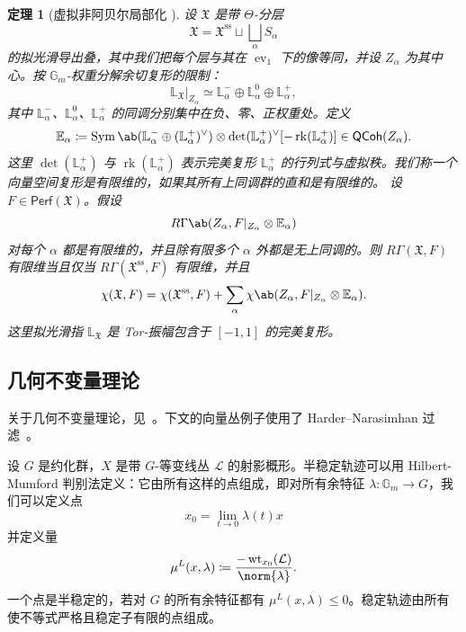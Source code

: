 \documentclass{amsart}
\newtheorem{thm}{定理}[section]
\theoremstyle{definition}
\theoremstyle{remark}
\theoremstyle{plain}
\theoremstyle{definition}
\theoremstyle{remark}
\newcommand{\G}{\mathbb{G}}
\newcommand{\E}{\mathbb{E}}
\renewcommand{\L}{\mathbb{L}}
\newcommand{\mc}[1]{\mathcal{#1}}
\newcommand{\mf}[1]{\mathfrak{#1}}
\newcommand{\mr}[1]{\mathrm{#1}}
\newcommand{\on}[1]{\operatorname{#1}}
\newcommand{\ms}[1]{\mathsf{#1}}
\newcommand{\1}{\mathbf{1}}
\newcommand{\2}{\mathbf{2}}
\newcommand{\3}{\mathbf{3}}
\DeclareMathOperator{\ev}{ev}
\begin{document}
\begin{thm}[虚拟非阿贝尔局部化 {\cite[Theorem~5.1]{HLlocalization}}]
    设 \(\mf{X}\) 是带 \(\Theta\)-分层
    \[
        \mf{X}
        =
        \mf{X}^{\mr{ss}}
        \sqcup
        \bigsqcup_\alpha S_\alpha
    \]
    的拟光滑导出叠，其中我们把每个层与其在 \(\ev_1\) 下的像等同，并设 \(Z_\alpha\) 为其中心。按 \(\G_m\)-权重分解余切复形的限制：
    \[
        \L_{\mf{X}}|_{Z_\alpha}
        \simeq
        \L_\alpha^-
        \oplus
        \L_\alpha^0
        \oplus
        \L_\alpha^+,
    \]
    其中 \(\L_\alpha^-\)、\(\L_\alpha^0\)、\(\L_\alpha^+\) 的同调分别集中在负、零、正权重处。定义
    \[
        \E_\alpha
        \coloneqq
        \on{Sym}\ab(
            \L_\alpha^-
            \oplus
            (\L_\alpha^+)^\vee
        )
        \otimes
        \det(\L_\alpha^+)^\vee
        [-\on{rk}(\L_\alpha^+)]
        \in
        \ms{QCoh}(Z_\alpha).
    \]
    这里 \(\det(\L_\alpha^+)\) 与 \(\on{rk}(\L_\alpha^+)\) 表示完美复形 \(\L_\alpha^+\) 的行列式与虚拟秩。我们称一个向量空间复形是有限维的，如果其所有上同调群的直和是有限维的。
    设 \(F\in\ms{Perf}(\mf{X})\)。假设
    \[
        R\Gamma\ab(
            Z_\alpha,
            F|_{Z_\alpha}\otimes\E_\alpha
        )
    \]
    对每个 \(\alpha\) 都是有限维的，并且除有限多个 \(\alpha\) 外都是无上同调的。则 \(R\Gamma(\mf{X},F)\) 有限维当且仅当 \(R\Gamma(\mf{X}^{\mr{ss}},F)\) 有限维，并且
    \[
        \chi(\mf{X},F)
        =
        \chi(\mf{X}^{\mr{ss}},F)
        +
        \sum_\alpha
        \chi\ab(
            Z_\alpha,
            F|_{Z_\alpha}\otimes\E_\alpha
        ).
    \]
    这里拟光滑指 \(\L_{\mf{X}}\) 是 Tor-振幅包含于 \([-1,1]\) 的完美复形。
\end{thm}


\subsection{几何不变量理论}%
\label{sub:Geometric invariant theory}

关于几何不变量理论，见~\cite{MFK1994}。下文的向量丛例子使用了 Harder--Narasimhan 过滤~\cite{HN1975}。

设 \(G\) 是约化群，\(X\) 是带 \(G\)-等变线丛 \(\mc{L}\) 的射影概形。半稳定轨迹可以用 Hilbert-Mumford 判别法定义：它由所有这样的点组成，即对所有余特征
\(\lambda \colon \G_m \to G\)，我们可以定义点
\[ x_0 = \lim_{t \to 0} \lambda(t) x \]
并定义量
\[ \mu^L(x, \lambda) \coloneqq \frac{-\on{wt}_{x_0}(\mc{L})}{\norm{\lambda}}. \]
一个点是半稳定的，若对 \(G\) 的所有余特征都有 \(\mu^L(x, \lambda) \leq 0\)。稳定轨迹由所有使不等式严格且稳定子有限的点组成。
\end{document}
